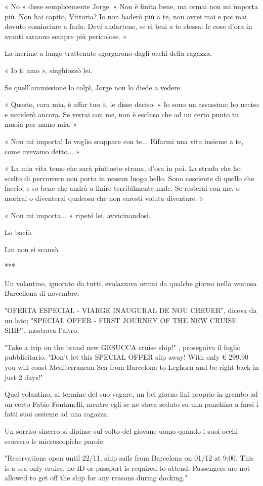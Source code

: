 « No » disse semplicemente Jorge. « Non è finita bene, ma ormai non mi importa più. Non hai capito, Vittoria? Io non baderò più a te, non avrei mai e poi mai dovuto cominciare a farlo. Devi andartene, se ci teni a te stessa: le cose d'ora in avanti saranno sempre più pericolose. »

La lacrime a lungo trattenute sgorgarono dagli occhi della ragazza:

« Io ti amo », singhiozzò lei.

Se quell'ammissione lo colpì, Jorge non lo diede a vedere.

« Questo, cara mia, è affar tuo », le disse deciso. « Io sono un assassino: ho ucciso e ucciderò ancora. Se verrai con me, non è escluso che ad un certo punto tu muoia per mano mia. »

« Non mi importa! Io voglio scappare con te... Rifarmi una vita insieme a te, come avevamo detto... »

« La mia vita temo che sarà piuttosto strana, d'ora in poi. La strada che ho scelto di percorrere non porta in nessun luogo bello. Sono cosciente di quello che faccio, e so bene che andrà a finire terribilmente male. Se resterai con me, o morirai o diventerai qualcosa che non saresti voluta diventare. »

« Non mi importa... » ripeté lei, avvicinandosi.

Lo baciò.

Lui non si scansò.

***

Un volantino, ignorato da tutti, svolazzava ormai da qualche giorno nella ventosa Barcellona di novembre.

"OFERTA ESPECIAL - VIARGE INAUGURAL DE NOU CREUER", diceva da un lato; "SPECIAL OFFER - FIRST JOURNEY OF THE NEW CRUISE SHIP", mostrava l'altro.

"Take a trip on the brand new GESUCCA cruise ship!" , proseguiva il foglio pubblicitario. "Don't let this SPECIAL OFFER slip away! With only € 299.90 you will coast Mediterranean Sea from Barcelona to Leghorn and be right back in just 2 days!"

Quel volantino, al termine del suo vagare, un bel giorno finì proprio in grembo ad un certo Fabio Fontanelli, mentre egli se ne stava seduto su una panchina a farsi i fatti suoi assieme ad una ragazza.

Un sorriso sincero si dipinse sul volto del giovane uomo quando i suoi occhi scorsero le microscopiche parole:

"Reservations open until 22/11, ship sails from Barcelona on 01/12 at 9:00. This is a sea-only cruise, no ID or passport is required to attend. Passengers are not allowed to get off the ship for any reasons during docking."

